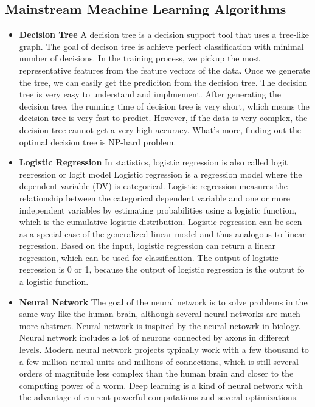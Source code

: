 \subsection{Mainstream Meachine Learning Algorithms}

\begin{itemize}
\item \textbf{Decision Tree}
A decision tree is a decision support tool that uses a tree-like graph.
The goal of decison tree is achieve perfect classification with minimal number of decisions.
In the training process, we pickup the most representative features from the feature vectors of the data.
Once we generate the tree, we can easily get the prediciton from the decision tree.
The decision tree is very easy to understand and implmement.
After generating the decision tree, the running time of decision tree is very short,
which means the decision tree is very fast to predict.
However, if the data is very complex, the decision tree cannot get a very high accuracy.
What's more, finding out the optimal decision tree is NP-hard problem.

\item \textbf{Logistic Regression}
In statistics, logistic regression is also called logit regression or logit model
Logistic regression is a regression model where the dependent variable (DV) is categorical.
Logistic regression measures the relationship between the categorical dependent variable and
one or more independent variables by estimating probabilities using a logistic function,
which is the cumulative logistic distribution.
Logistic regression can be seen as a special case of the generalized linear model and thus analogous to linear regression. 
Based on the input, logistic regression can return a linear regression, which can be used for classification.
The output of logistic regression is 0 or 1, because the output of logistic regression is the output fo a logistic function.

\item \textbf{Neural Network}
The goal of the neural network is to solve problems in the same way like the human brain,
although several neural networks are much more abstract.
Neural network is inspired by the neural netowrk in biology.
Neural network includes a lot of neurons connected by axons in different levels.
Modern neural network projects typically work with a few thousand
to a few million neural units and millions of connections,
which is still several orders of magnitude less complex than the
human brain and closer to the computing power of a worm.
Deep learning is a kind of neural network with the advantage of current powerful computations 
and several optimizations.


\end{itemize}
